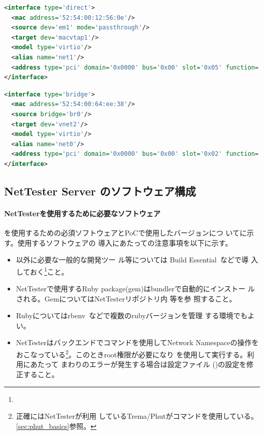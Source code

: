 \begin{lstlisting}[language=xml,caption=PSW接続用ポート設定,label=lst:kvmconf-psw-port]
<interface type='direct'>
  <mac address='52:54:00:12:56:0e'/>
  <source dev='em1' mode='passthrough'/>
  <target dev='macvtap1'/>
  <model type='virtio'/>
  <alias name='net1'/>
  <address type='pci' domain='0x0000' bus='0x00' slot='0x05' function='0x0'/>
</interface>
\end{lstlisting}
\begin{lstlisting}[language=xml,caption=管理ポート設定,label=lst:kvmconf-mgmt-port]
<interface type='bridge'>
  <mac address='52:54:00:64:ee:38'/>
  <source bridge='br0'/>
  <target dev='vnet2'/>
  <model type='virtio'/>
  <alias name='net0'/>
  <address type='pci' domain='0x0000' bus='0x00' slot='0x02' function='0x0'/>
</interface>
\end{lstlisting}


  \subsection{NetTester Server のソフトウェア構成}
  \label{sec:nettester-server-software}


    \paragraph{NetTesterを使用するために必要なソフトウェア}
\nettester を使用するための必須ソフトウェアとPoCで使用したバージョンにつ
いてに示す。使用するソフトウェアの
導入にあたっての注意事項を以下に示す。
\begin{itemize}
 \item {}以外に必要な一般的な開発ツー
       ル等については Build Essential~\cite{build-essential-doc}などで導
       入しておく\footnote{}こと。
 \item NetTesterで使用するRuby package(gem)はbundlerで自動的にインストー
       ルされる。GemについてはNetTesterリポジトリ内 等を参
       照すること。
 \item Rubyについてはrbenv~\cite{rbenv}などで複数のrubyバージョンを管理
       する環境でもよい。
 \item NetTesterはバックエンドでコマンドを使用してNetwork
       Namespaceの操作をおこなっている\footnote{正確にはNetTesterが利用
       しているTrema/Phutがコマンドを使用している。
       \ref{sec:phut_basics}参照。}。このときroot権限が必要になり
       を使用して実行する。利用にあたって
       まわりのエラーが発生する場合は設定ファイル
       ()の設定を修正すること。
\end{itemize}


